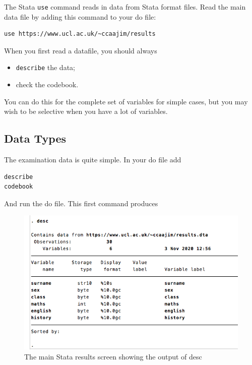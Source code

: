 \documentclass[
]{article}
\providecommand{\tightlist}{%
  \setlength{\itemsep}{0pt}\setlength{\parskip}{0pt}}
\begin{document}
The Stata \texttt{use} command reads in data from Stata format files. Read the main data file by adding this command to your do file:

\begin{verbatim}
use https://www.ucl.ac.uk/~ccaajim/results
\end{verbatim}

When you first read a datafile, you should always

\begin{itemize}
\tightlist
\item
  \texttt{describe} the data;
\item
  check the codebook.
\end{itemize}

You can do this for the complete set of variables for simple cases, but you may wish to be selective when you have a lot of variables.

\hypertarget{data-types}{%
\subsection{Data Types}\label{data-types}}

The examination data is quite simple. In your do file add

\begin{verbatim}
describe
codebook
\end{verbatim}

And run the do file. This first command produces

\begin{figure}
\centering
\includegraphics{./images/describeoutput1.png}
\caption{The main Stata results screen showing the output of desc}
\end{figure}
\end{document}
